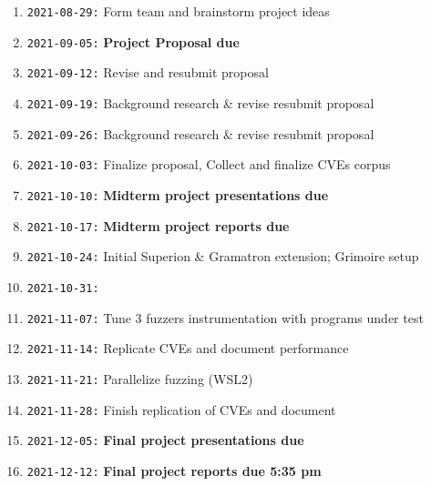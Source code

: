 \documentclass[12pt]{diazessay}
\begin{document}
\begin{enumerate}[label={}]
	\item \texttt{2021-08-29:} Form team and brainstorm project ideas
	\item \texttt{2021-09-05:} \textbf{Project Proposal due}
	\item \texttt{2021-09-12:} Revise and resubmit proposal
	\item \texttt{2021-09-19:} Background research \& revise \/ resubmit proposal
	\item \texttt{2021-09-26:} Background research \& revise \/ resubmit proposal
	\item \texttt{2021-10-03:} Finalize proposal, Collect and finalize CVEs corpus
	\item \texttt{2021-10-10:} \textbf{Midterm project presentations due}
	\item \texttt{2021-10-17:} \textbf{Midterm project reports due}
	\item \texttt{2021-10-24:} Initial Superion \& Gramatron extension; Grimoire setup
	\item \texttt{2021-10-31:} 
	\item \texttt{2021-11-07:} Tune 3 fuzzers instrumentation with programs under test
	\item \texttt{2021-11-14:} Replicate CVEs and document performance
	\item \texttt{2021-11-21:} Parallelize fuzzing \hfill (WSL2)
	\item \texttt{2021-11-28:} Finish replication of CVEs and document
	\item \texttt{2021-12-05:} \textbf{Final project presentations due}
	\item \texttt{2021-12-12:} \textbf{Final project reports due 5:35 pm}
\end{enumerate}


\clearpage
\end{document}
